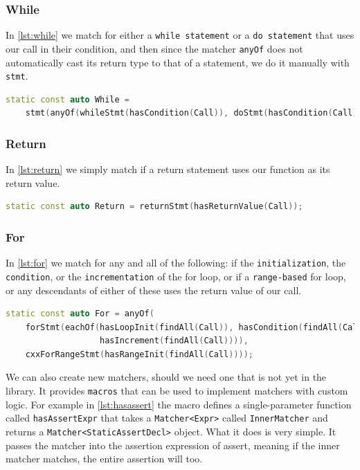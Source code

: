 \subsubsection{While}

In \cref{lst:while} we match
for either a \texttt{while statement} or a \texttt{do statement} that uses our call in their condition, and then since the matcher
\texttt{anyOf} does not automatically cast its return type to that of a statement, we do it manually with \texttt{stmt}.

\begin{lstlisting}[language={C++},caption={The matcher for usage in while expression.},label={lst:while}]
static const auto While =
	stmt(anyOf(whileStmt(hasCondition(Call)), doStmt(hasCondition(Call))));
\end{lstlisting}

\subsubsection{Return}

In \cref{lst:return} we simply match if a return statement uses our function as its return value.

\begin{lstlisting}[language={C++},caption={The matcher for the usage in return statement.},label={lst:return}]
static const auto Return = returnStmt(hasReturnValue(Call));
\end{lstlisting}

\subsubsection{For}

In \cref{lst:for} we match for
any and all of the following: if the \texttt{initialization}, the \texttt{condition}, or the \texttt{incrementation} of the for
loop, or if a \texttt{range-based} for loop, or any descendants of either of these uses the return value of our call.

\begin{lstlisting}[language={C++},caption={The matcher for the usage in for statement.},label={lst:for}]
static const auto For = anyOf(
	forStmt(eachOf(hasLoopInit(findAll(Call)), hasCondition(findAll(Call)),
				   hasIncrement(findAll(Call)))),
	cxxForRangeStmt(hasRangeInit(findAll(Call))));
\end{lstlisting}

We can also create new matchers, should we need one that is not yet in the library. %
It provides \texttt{macros} that can be used to implement matchers with custom logic. For example in \cref{lst:hasassert} the
macro defines a single-parameter function called \texttt{hasAssertExpr} that takes a \texttt{Matcher<Expr>} called
\texttt{InnerMatcher} and returns a \texttt{Matcher<StaticAssertDecl>} object. What it does is very simple. It passes the
matcher into the assertion expression of assert, meaning if the inner matcher matches, the entire assertion will too.

